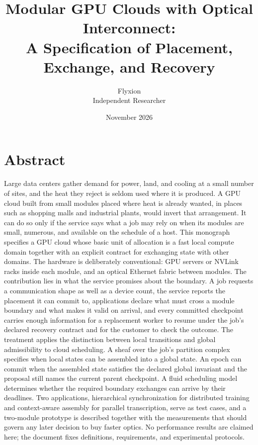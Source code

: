 \documentclass[11pt,openany]{book}
\title{Modular GPU Clouds with Optical Interconnect:\\
A Specification of Placement, Exchange, and Recovery}
\author{Flyxion\\Independent Researcher}
\date{November 2026}
\theoremstyle{remark}
\begin{document}
\maketitle

\chapter*{Abstract}
Large data centers gather demand for power, land, and cooling at a small number of sites, and the heat they reject is seldom used where it is produced. A GPU cloud built from small modules placed where heat is already wanted, in places such as shopping malls and industrial plants, would invert that arrangement. It can do so only if the service says what a job may rely on when its modules are small, numerous, and available on the schedule of a host. This monograph specifies a GPU cloud whose basic unit of allocation is a fast local compute domain together with an explicit contract for exchanging state with other domains. The hardware is deliberately conventional: GPU servers or NVLink racks inside each module, and an optical Ethernet fabric between modules. The contribution lies in what the service promises about the boundary. A job requests a communication shape as well as a device count, the service reports the placement it can commit to, applications declare what must cross a module boundary and what makes it valid on arrival, and every committed checkpoint carries enough information for a replacement worker to resume under the job's declared recovery contract and for the customer to check the outcome. The treatment applies the distinction between local transitions and global admissibility to cloud scheduling. A sheaf over the job's partition complex specifies when local states can be assembled into a global state. An epoch can commit when the assembled state satisfies the declared global invariant and the proposal still names the current parent checkpoint. A fluid scheduling model determines whether the required boundary exchanges can arrive by their deadlines. Two applications, hierarchical synchronization for distributed training and context-aware assembly for parallel transcription, serve as test cases, and a two-module prototype is described together with the measurements that should govern any later decision to buy faster optics. No performance results are claimed here; the document fixes definitions, requirements, and experimental protocols.

\tableofcontents

\end{document}
